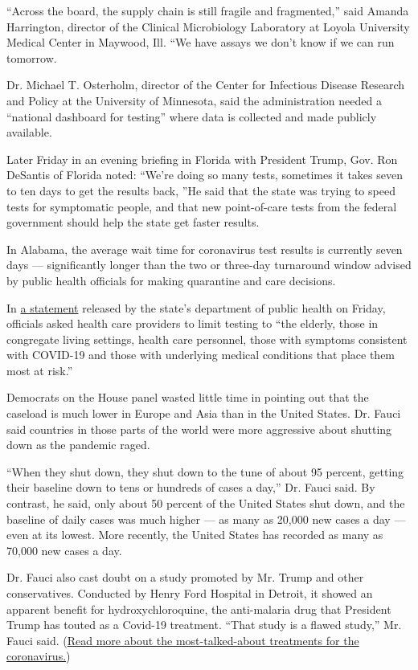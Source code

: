 ``Across the board, the supply chain is still fragile and fragmented,''
said Amanda Harrington, director of the Clinical Microbiology Laboratory
at Loyola University Medical Center in Maywood, Ill. ``We have assays we
don't know if we can run tomorrow.

Dr. Michael T. Osterholm, director of the Center for Infectious Disease
Research and Policy at the University of Minnesota, said the
administration needed a ``national dashboard for testing'' where data is
collected and made publicly available.

Later Friday in an evening briefing in Florida with President Trump,
Gov. Ron DeSantis of Florida noted: ``We're doing so many tests,
sometimes it takes seven to ten days to get the results back, ''He said
that the state was trying to speed tests for symptomatic people, and
that new point-of-care tests from the federal government should help the
state get faster results.

In Alabama, the average wait time for coronavirus test results is
currently seven days --- significantly longer than the two or three-day
turnaround window advised by public health officials for making
quarantine and care decisions.

In \href{https://www.alabamapublichealth.gov/news/2020/07/31e.html}{a
statement} released by the state's department of public health on
Friday, officials asked health care providers to limit testing to ``the
elderly, those in congregate living settings, health care personnel,
those with symptoms consistent with COVID-19 and those with underlying
medical conditions that place them most at risk.''

Democrats on the House panel wasted little time in pointing out that the
caseload is much lower in Europe and Asia than in the United States. Dr.
Fauci said countries in those parts of the world were more aggressive
about shutting down as the pandemic raged.

``When they shut down, they shut down to the tune of about 95 percent,
getting their baseline down to tens or hundreds of cases a day,'' Dr.
Fauci said. By contrast, he said, only about 50 percent of the United
States shut down, and the baseline of daily cases was much higher --- as
many as 20,000 new cases a day --- even at its lowest. More recently,
the United States has recorded as many as 70,000 new cases a day.

Dr. Fauci also cast doubt on a study promoted by Mr. Trump and other
conservatives. Conducted by Henry Ford Hospital in Detroit, it showed an
apparent benefit for hydroxychloroquine, the anti-malaria drug that
President Trump has touted as a Covid-19 treatment. ``That study is a
flawed study,'' Mr. Fauci said.
(\href{https://www.nytimes3xbfgragh.onion/interactive/2020/science/coronavirus-drugs-treatments.html}{Read
more about the most-talked-about treatments for the coronavirus.})

